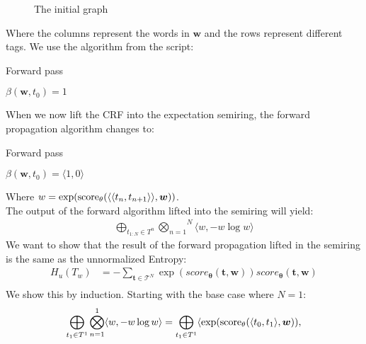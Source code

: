 \documentclass[a4paper,12pt]{ETHexercise}
\begin{document}
\begin{question}
\begin{subquestion}
\begin{figure}[H]
\begin{tikzpicture}[node distance={20mm}, thick, main/.style = {draw, circle}]
			\end{tikzpicture}
			\caption[]{The initial graph}
			\label{figure:graph}
		\end{figure}
		Where the columns represent the words in $\mathbf{w}$ and the rows represent different tags.
		We use the algorithm from the script:\\
		\begin{algorithm}[H]
			\SetAlgoLined
			\caption{Forward pass}
			\label{algorithm:forward}
			$\beta(\mathbf{w}, t_0) = 1$\\
		\end{algorithm}
		When we now lift the CRF into the expectation semiring, the forward propagation algorithm changes to:\\
		\begin{algorithm}[H]
			\SetAlgoLined
			\caption{Forward pass}
			\label{algorithm:forward_semi}
			$\beta(\mathbf{w}, t_0) = \langle 1, 0 \rangle$\\
		\end{algorithm}
		Where $w = \exp(\score{\langle t_n}{t_{n+1}\rangle})$.\\
		The output of the forward algorithm lifted into the semiring will yield:\\
		\begin{align}
			\bigoplus_{t_{1:N} \in T^{n}} \overset{N}{\bigotimes_{n=1}} \langle w, -w \log w \rangle
		\end{align}
		We want to show that the result of the forward propagation lifted in the semiring is the same as the unnormalized Entropy:
		\begin{align}
			H_u(T_{w}) & = -\sum_{\mathbf{t} \in \mathcal{T}^N} \exp(score_{\boldsymbol{\theta}} (\mathbf{t},\boldsymbol{w})) score_{\boldsymbol{\theta}} (\mathbf{t},\boldsymbol{w}) \label{eq:1b_to_show} \\
		\end{align}
		We show this by induction. Starting with the base case where $N = 1$:\\
		\begin{align}
			\bigoplus_{t_{1} \in T^{1}} \overset{1}{\bigotimes_{n=1}} \langle w, -w \log w \rangle & = \bigoplus_{t_{1} \in T^{1}} \langle \exp(\score{t_0}{t_1}),                     \\

\end{align}
\end{subquestion}
\end{question}
\end{document}
